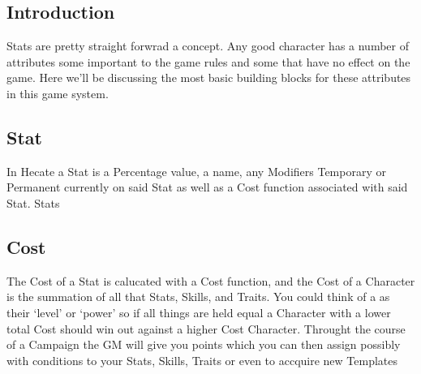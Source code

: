 
\subsection{Introduction}
Stats are pretty straight forwrad a concept.  Any good character
has a number of attributes some important to the game rules and
some that have no effect on the game.  Here we'll be discussing
the most basic building blocks for these attributes in this game
system.

\subsection{Stat}
In Hecate a \gls{Stat} is a Percentage value, a name, any
\glspl{Modifier} Temporary or Permanent currently on said \gls{Stat}
as well as a \gls{Cost} function associated with said \gls{Stat}.
\glspl{Stat}

\subsection{Cost}
The \gls{Cost} of a \gls{Stat} is calucated with a \gls{Cost}
function, and the \gls{Cost} of a \gls{Character} is the summation
of all that  \glspl{Stat},
\glspl{Skill}, and \glspl{Trait}.  You could think of a
 as their `level' or `power'
so if all things are held equal a \gls{Character} with a lower
total \gls{Cost} should win out against a higher \gls{Cost}
\gls{Character}.  Throught the course of a \gls{Campaign} the
\gls{GM} will give you points which you can then assign possibly
with conditions to your \glspl{Stat}, \glspl{Skill}, \glspl{Trait}
or even to accquire new \glspl{Template}

